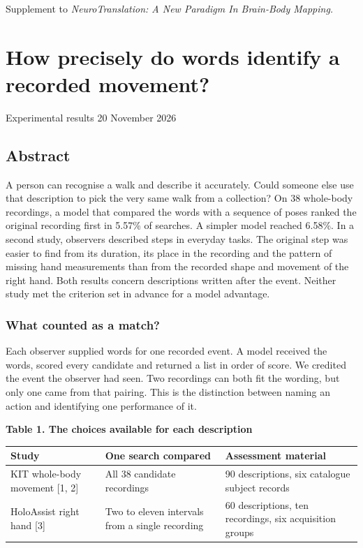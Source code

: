 \begingroup
\sffamily
\noindent Supplement to \emph{NeuroTranslation: A New Paradigm In Brain-Body Mapping.}\par

\section*{How precisely do words identify a recorded movement?}

\noindent Experimental results \textperiodcentered{} 20 November 2026\par

\subsection*{Abstract}

\noindent A person can recognise a walk and describe it accurately. Could someone else use that description to pick the very same walk from a collection? On 38 whole-body recordings, a model that compared the words with a sequence of poses ranked the original recording first in 5.57\% of searches. A simpler model reached 6.58\%. In a second study, observers described steps in everyday tasks. The original step was easier to find from its duration, its place in the recording and the pattern of missing hand measurements than from the recorded shape and movement of the right hand. Both results concern descriptions written after the event. Neither study met the criterion set in advance for a model advantage.\par

\subsubsection*{What counted as a match?}

\noindent Each observer supplied words for one recorded event. A model received the words, scored every candidate and returned a list in order of score. We credited the event the observer had seen. Two recordings can both fit the wording, but only one came from that pairing. This is the distinction between naming an action and identifying one performance of it.\par

\par\medskip\noindent\textbf{Table 1. The choices available for each description}
\par\smallskip\noindent
\begin{tabular}{@{}p{.28\linewidth}p{.28\linewidth}p{.35\linewidth}@{}}
\textbf{Study} & \textbf{One search compared} & \textbf{Assessment material} \\
\hline
KIT whole-body movement [1, 2] & All 38 candidate recordings & 90 descriptions, six catalogue subject records \\
HoloAssist right hand [3] & Two to eleven intervals from a single recording & 60 descriptions, ten recordings, six acquisition groups \\
\end{tabular}\par\medskip

